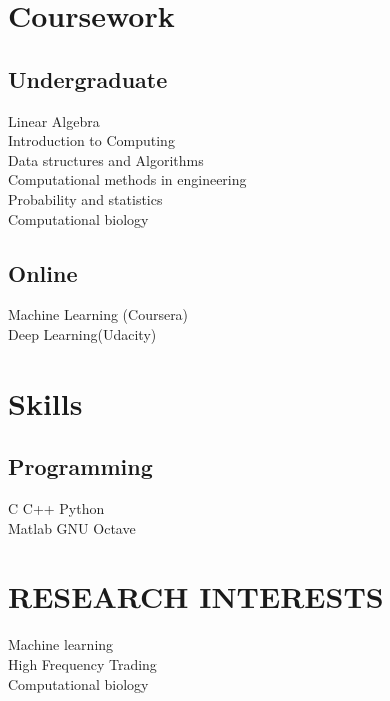 \documentclass[]{deedy-resume-openfont}
\begin{document}
\begin{minipage}[t]{0.33\textwidth}
\section{Coursework}

\subsection{Undergraduate}
Linear Algebra \\
Introduction to Computing \\
Data structures and Algorithms\\
Computational methods in engineering \\
Probability and statistics \\
Computational biology\\
\sectionsep
\subsection{Online}
Machine Learning (Coursera)\\
Deep Learning(Udacity)

\sectionsep


\section{Skills}
\subsection{Programming}
 C \textbullet{} 
 C++ \textbullet{} 
 Python %
\\ 
Matlab \textbullet{} GNU Octave %

\sectionsep

\section{RESEARCH INTERESTS}

 Machine learning \\%
 High Frequency Trading \\%
 Computational biology \\%

\sectionsep

%
%

\end{minipage} 
\end{document}
